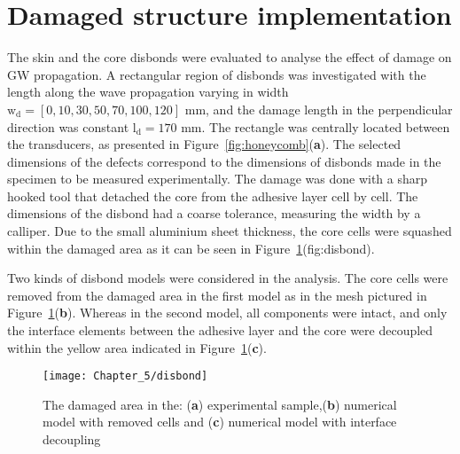 \section{Damaged structure implementation}
\label{sec:disbond}
The skin and the core disbonds were evaluated to analyse the effect of damage on GW propagation.
A rectangular region of disbonds was investigated with the length along the wave propagation varying in width \(\mathrm{w_d} = [0,10,30,50,70,100,120]\) mm, and the damage length in the perpendicular direction was constant \(\mathrm{l_d} = 170\) mm.
The rectangle was centrally located between the transducers, as presented in Figure~\ref{fig:honeycomb}(\textbf{a}).
The selected dimensions of the defects correspond to the dimensions of disbonds made in the specimen to be measured experimentally.
The damage was done with a sharp hooked tool that detached the core from the adhesive layer cell by cell.
The dimensions of the disbond had a coarse tolerance, measuring the width by a calliper.
Due to the small aluminium sheet thickness, the core cells were squashed within the damaged area as it can be seen in Figure~\ref{fig:disbond}(fig:disbond).

Two kinds of disbond models were considered in the analysis.
The core cells were removed from the damaged area in the first model as in the mesh pictured in Figure~\ref{fig:disbond}(\textbf{b}).
Whereas in the second model, all components were intact, and only the interface elements between the adhesive layer and the core were decoupled within the yellow area indicated in Figure~\ref{fig:disbond}(\textbf{c}).
\begin{figure}[!bh]
	\begin{center}
		\texttt{[image: Chapter\_5/disbond]}
	\end{center}
	\caption{The damaged area in the: (\textbf{a}) experimental sample,(\textbf{b}) numerical model with removed cells and (\textbf{c}) numerical model with interface decoupling}
	\label{fig:disbond}
\end{figure}